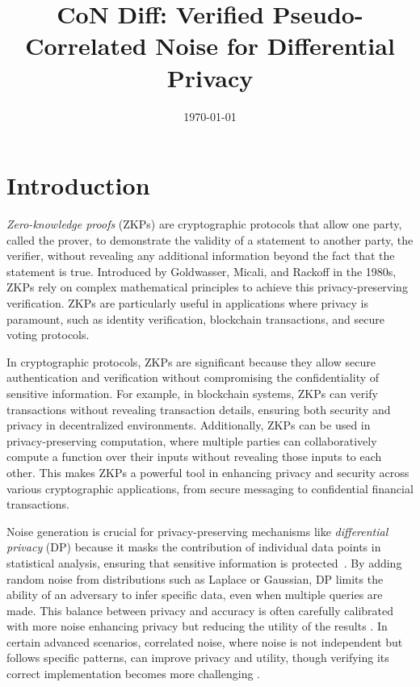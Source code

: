 \documentclass[11pt]{article}
\newcommand{\myname}{Lev Stambler}
\begin{document}
\title{CoN Diff: Verified Pseudo-Correlated Noise for Differential Privacy}


\date{\today}
\maketitle




\section{Introduction}
    \emph{Zero-knowledge proofs} (ZKPs) are cryptographic protocols that allow one party, called the prover, to demonstrate the validity of a statement to another party, the verifier, without revealing any additional information beyond the fact that the statement is true. 
    Introduced by Goldwasser, Micali, and Rackoff in the 1980s, ZKPs rely on complex mathematical principles to achieve this privacy-preserving verification. 
    ZKPs are particularly useful in applications where privacy is paramount, such as identity verification, blockchain transactions, and secure voting protocols.

    In cryptographic protocols, ZKPs are significant because they allow secure authentication and verification without compromising the confidentiality of sensitive information. 
    For example, in blockchain systems, ZKPs can verify transactions without revealing transaction details, ensuring both security and privacy in decentralized environments. 
    Additionally, ZKPs can be used in privacy-preserving computation, where multiple parties can collaboratively compute a function over their inputs without revealing those inputs to each other.
    This makes ZKPs a powerful tool in enhancing privacy and security across various cryptographic applications, from secure messaging to confidential financial transactions.
    
    Noise generation is crucial for privacy-preserving mechanisms like \emph{differential privacy} (DP) because it masks the contribution of individual data points in statistical analysis, ensuring that sensitive information is protected~\cite{dwork2006differential}. 
    By adding random noise from distributions such as Laplace or Gaussian, DP limits the ability of an adversary to infer specific data, even when multiple queries are made. 
    This balance between privacy and accuracy is often carefully calibrated with more noise enhancing privacy but reducing the utility of the results . 
    In certain advanced scenarios, correlated noise, where noise is not independent but follows specific patterns, can improve privacy and utility, though verifying its correct implementation becomes more challenging .
\end{document}
